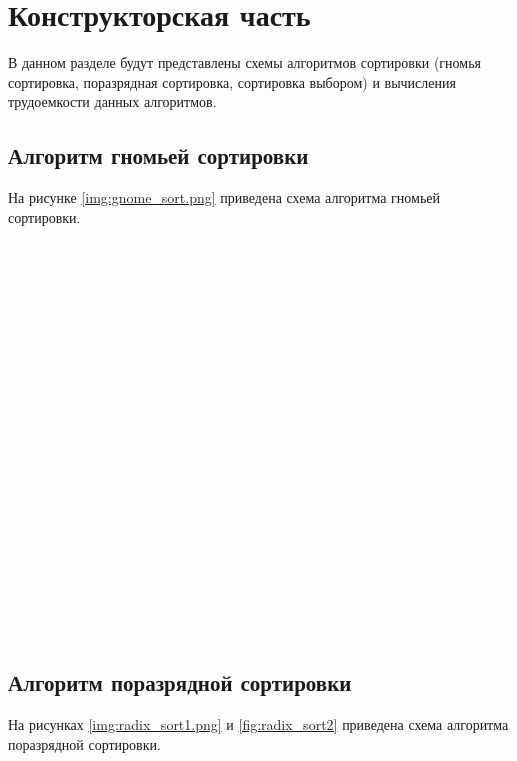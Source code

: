 \chapter{Конструкторская часть}
В данном разделе будут представлены схемы алгоритмов сортировки (гномья сортировка, поразрядная сортировка, сортировка выбором) и вычисления трудоемкости данных алгоритмов.
 

\section{Алгоритм гномьей сортировки}

На рисунке \ref{img:gnome_sort.png} приведена схема алгоритма гномьей сортировки.
\\
\\
\\
\\
\\
\\
\\
\\
\\
\\
\\
\\
\\
\\
\\
\\
\\
\\
\\
\\
\\
\\



\FloatBarrier
\section{Алгоритм поразрядной сортировки}
На рисунках \ref{img:radix_sort1.png} и \ref{fig:radix_sort2} приведена схема алгоритма поразрядной сортировки.
\\
\\
\\
\\
\\
\\
\\
\\
\\
\\
\\
\\
\\
\\
\\
\\
\\
\\
\\
\\
\\
\\
\\
\\
\\
\\
\\
\\

